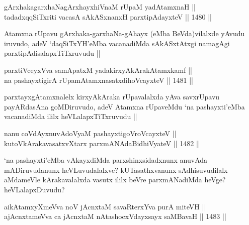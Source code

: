 
\begin{shl}
gArxhakagarxhaNagArxhayxhiVnaM rUpaM yadAtamxnaH || \\
tadadxqqSiTxriti vacasA sAkASxnanxH parxtipAdayxteV ||  1480 ||  
\end{shl}

\begin{artha}
Atamxna rUpavu gArxhaka-garxhaNa-gAhayx (eMba BeVda)vilalxde yAvudu iruvudo, adeV `daqSiTxYH'eMba vacanadiMda sAkASxtAtxgi namagAgi parxtipAdisalapxTiTxruvudu ||
\end{artha}


\begin{shl}
parxtiVceyxVva samApatxM yadakirxyAkArakAtamxkamf || \\
na pashayxtigirA rUpamAtamxnasatxdihoVcayxteV ||  1481 ||  
\end{shl}

\begin{artha}
parxtayxgAtamxnalelx kirxyAkAraka rUpavalalxda yAva savxrUpavu payARdasAna goMDiruvudo, adeV Atamxna rUpaveMdu `na pashayxti'eMba vacanadiMda ililx heVLalapxTiTxruvudu ||
\end{artha}


\begin{shl}
nanu coVdAyxnuvAdoV\s yaM pashayxtigoVroVcayxteV || \\
kutoV\s kArakavasatxvXtarx parxmANAdaBidhiVyateV ||  1482 ||  
\end{shl}

\begin{artha}
`na pashayxti'eMba vAkayxdiMda parxshinxsidadxnunx anuvAda mADiruvudanunx heVLuvudalalxve? kUTasathxvanunx sAdhisuvudilalx aMdameVle kArakavalalxda vasutx ililx beVre parxmANadiMda heVge? heVLalapxDuvudu?
\end{artha}


\begin{shl}
aikAtamxyXmeVva noV jAcnxtaM savaRterxYva purA miteVH || \\
ajAcnxtameVva ca jAcnxtaM nAtashocxVdayxsayx saMBavaH ||  1483 ||  
\end{shl}

